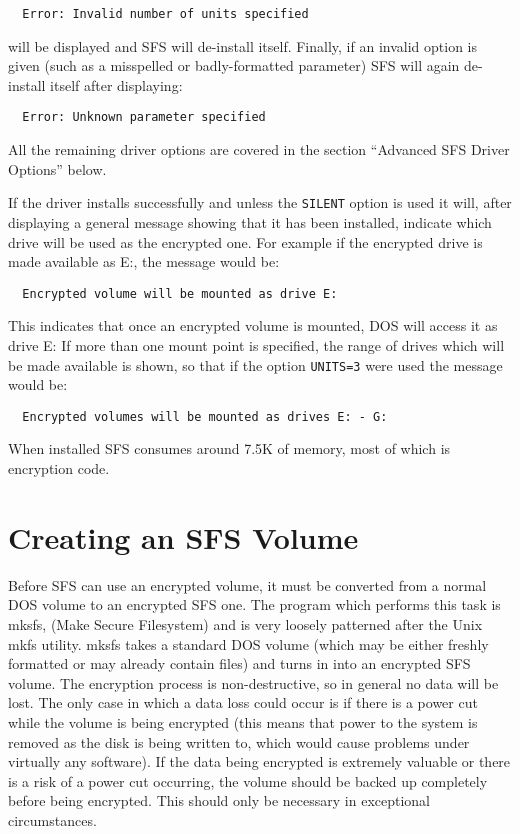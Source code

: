 {\tt \verb|  |Error: Invalid number of units specified}

will be displayed and SFS will de-install itself.  Finally, if an invalid
option is given (such as a misspelled or badly-formatted parameter) SFS will
again de-install itself after displaying:

{\tt \verb|  |Error: Unknown parameter specified}

All the remaining driver options are covered in the section ``Advanced SFS
Driver Options'' below.

If the driver installs successfully and unless the {\tt SILENT} option is used it
will, after displaying a general message showing that it has been installed,
indicate which drive will be used as the encrypted one.  For example if
the encrypted drive is made available as E:, the message would be:

{\tt \verb|  |Encrypted volume will be mounted as drive E:}

This indicates that once an encrypted volume is mounted, DOS will access it as
drive E:  If more than one mount point is specified, the range of drives which
will be made available is shown, so that if the option {\tt UNITS=3} were used the
message would be:

{\tt \verb|  |Encrypted volumes will be mounted as drives E: - G:}

When installed SFS consumes around 7.5K of memory, most of which is encryption
code.



\section{Creating an SFS Volume}

Before SFS can use an encrypted volume, it must be converted from a normal DOS
volume to an encrypted SFS one.  The program which performs this task is mksfs,
(Make Secure Filesystem) and is very loosely patterned after the Unix mkfs
utility.  mksfs takes a standard DOS volume (which may be either freshly
formatted or may already contain files) and turns in into an encrypted SFS
volume.  The encryption process is non-destructive, so in general no data will
be lost.  The only case in which a data loss could occur is if there is a power
cut while the volume is being encrypted (this means that power to the system is
removed as the disk is being written to, which would cause problems under
virtually any software).  If the data being encrypted is extremely valuable or
there is a risk of a power cut occurring, the volume should be backed up
completely before being encrypted.  This should only be necessary in
exceptional circumstances.

